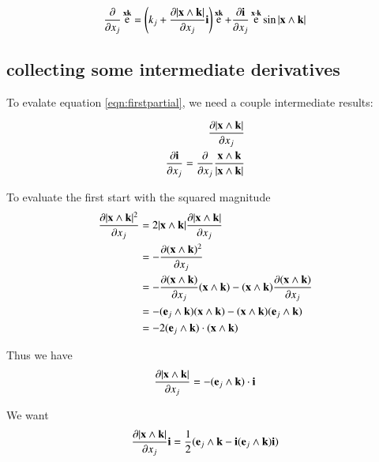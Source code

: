 \documentclass{article}      %
\newcommand{\dxj}[2] {\frac {\partial {#1}} {\partial {x_{#2}}}}
\DeclareMathOperator{\Exp}{e}
\begin{document}
\begin{equation}\label{eqn:firstpartial}
\dxj{}{j}\Exp^{\Bx\Bk}
= 
\left(k_j + \dxj{\abs{\Bx \wedge \Bk}}{j}\Bi\right) \Exp^{\Bx\Bk} + \dxj{\Bi}{j} \Exp^{\Bx \cdot \Bk} \sin{\abs{\Bx \wedge \Bk}}
\end{equation}

\subsection{ collecting some intermediate derivatives }

To evalate equation \ref{eqn:firstpartial}, we need a couple intermediate results:

\begin{align*}
\dxj{\abs{\Bx \wedge \Bk}}{j} \\
\dxj{\Bi}{j} = \dxj{}{j} \frac{\Bx \wedge \Bk}{\abs{\Bx \wedge \Bk}} \\
\end{align*}

To evaluate the first start with the squared magnitude
\begin{align*}
\dxj{\abs{\Bx \wedge \Bk}^2}{j} 
&= 2 {\abs{\Bx \wedge \Bk}} \dxj{\abs{\Bx \wedge \Bk}}{j} \\
&= -\dxj{(\Bx \wedge \Bk)^2}{j} \\
&= - \dxj{(\Bx \wedge \Bk)}{j} (\Bx \wedge \Bk) - (\Bx \wedge \Bk) \dxj{(\Bx \wedge \Bk)}{j} \\
&= - (\Be_j \wedge \Bk) (\Bx \wedge \Bk) - (\Bx \wedge \Bk) (\Be_j \wedge \Bk) \\
&= - 2 (\Be_j \wedge \Bk) \cdot (\Bx \wedge \Bk) \\
\end{align*}

Thus we have
\begin{equation}\label{eqn:partialabs}
\dxj{\abs{\Bx \wedge \Bk}}{j} = - (\Be_j \wedge \Bk) \cdot \Bi
\end{equation}

We want 
\[
\dxj{\abs{\Bx \wedge \Bk}}{j}\Bi
= \inv{2} ( \Be_j \wedge \Bk - \Bi (\Be_j \wedge \Bk) \Bi )
\]
\end{document}
